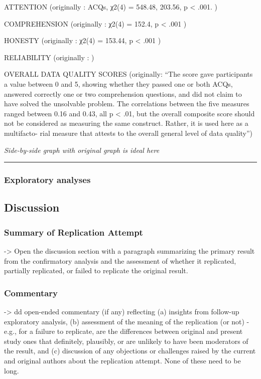 \documentclass[
]{article}
\begin{document}
ATTENTION (originally : ACQs, χ2(4) = 548.48, 203.56, p \textless{}
.001. )

COMPREHENSION (originally : χ2(4) = 152.4, p \textless{} .001 )

HONESTY (originally : χ2(4) = 153.44, p \textless{} .001 )

RELIABILITY (originally : )

OVERALL DATA QUALITY SCORES (originally: ``The score gave participants a
value between 0 and 5, showing whether they passed one or both ACQs,
answered correctly one or two comprehension questions, and did not claim
to have solved the unsolvable problem. The correlations between the five
measures ranged between 0.16 and 0.43, all p \textless{} .01, but the
overall composite score should not be considered as measuring the same
construct. Rather, it is used here as a multifacto- rial measure that
attests to the overall general level of data quality'')

\emph{Side-by-side graph with original graph is ideal here}

\begin{center}\rule{0.5\linewidth}{0.5pt}\end{center}

\hypertarget{exploratory-analyses}{%
\subsubsection{Exploratory analyses}\label{exploratory-analyses}}

\hypertarget{discussion}{%
\subsection{Discussion}\label{discussion}}

\hypertarget{summary-of-replication-attempt}{%
\subsubsection{Summary of Replication
Attempt}\label{summary-of-replication-attempt}}

-\textgreater{} Open the discussion section with a paragraph summarizing
the primary result from the confirmatory analysis and the assessment of
whether it replicated, partially replicated, or failed to replicate the
original result.

\hypertarget{commentary}{%
\subsubsection{Commentary}\label{commentary}}

-\textgreater{} dd open-ended commentary (if any) reflecting (a)
insights from follow-up exploratory analysis, (b) assessment of the
meaning of the replication (or not) - e.g., for a failure to replicate,
are the differences between original and present study ones that
definitely, plausibly, or are unlikely to have been moderators of the
result, and (c) discussion of any objections or challenges raised by the
current and original authors about the replication attempt. None of
these need to be long.
\end{document}
